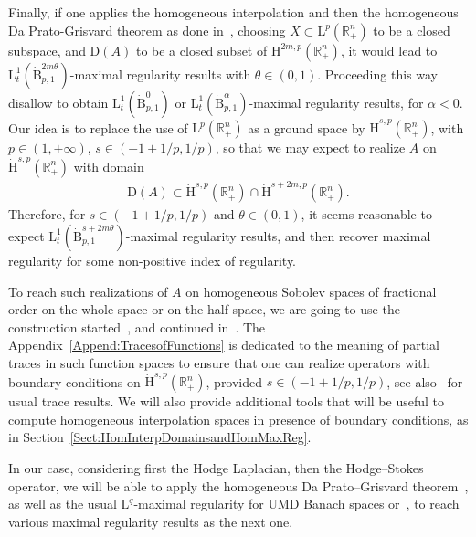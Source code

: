 \documentclass[10pt]{amsart}
\theoremstyle{definition}\newtheorem{defi}[theo]{Definition}\newtheorem{rema}[theo]{Remark}\newtheorem{exam}[theo]{Example}\newtheorem{exem}[theo]{Example}\newtheorem{nota}[theo]{Notation}
\newcommand{\bbR}{\mathbb{R}}
\newcommand{\rmH}{\mathrm{H}}%
\newcommand{\rmB}{\mathrm{B}}
\newcommand{\rmD}{\mathrm{D}}
\newcommand{\rmL}{\mathrm{L}}
\begin{document}
Finally, if one applies the homogeneous interpolation and then the homogeneous Da Prato-Grisvard theorem as done in~\cite[Chapters~2,~3~\&~4]{DanchinHieberMuchaTolk2020}, choosing $X\subset \rmL^p(\bbR^n_+)$ to be a closed subspace, and $\rmD(A)$ to be a closed subset of $\rmH^{2m,p}(\bbR^n_+)$, it would lead to $\rmL^1_t(\dot{\rmB}^{2m\theta}_{p,1})$-maximal regularity results with $\theta \in(0,1)$. Proceeding this way disallow to obtain $\rmL^1_t(\dot{\rmB}^{0}_{p,1})$ or $\rmL^1_t(\dot{\rmB}^{\alpha}_{p,1})$-maximal regularity results, for $\alpha<0$. Our idea is to replace the use of $\rmL^p(\bbR^n_+)$ as a ground space by $\dot{\rmH}^{s,p}(\bbR^n_+)$, with $p\in(1,+\infty)$, $s\in(-1+1/p,1/p)$, so that we may expect to realize $A$ on $\dot{\rmH}^{s,p}(\bbR^n_+)$ with domain
\begin{align*}
\rmD(A) \subset \dot{\rmH}^{s,p}\left(\bbR^n_+\right)\cap \dot{\rmH}^{s+2m,p}\left(\bbR^n_+\right).
\end{align*}
Therefore, for $s\in(-1+1/p,1/p)$ and $\theta\in(0,1)$, it seems reasonable to expect $\rmL^1_t(\dot{\rmB}^{s+2m\theta}_{p,1})$-maximal regularity results, and then recover maximal regularity for some non-positive index of regularity.

To reach such realizations of $A$ on homogeneous Sobolev spaces of fractional order on the whole space or on the half-space, we are going to use the construction started~\cite[Chapter~3]{DanchinHieberMuchaTolk2020}, and continued in~\cite[Sections~2~\&~3]{Gaudin2022}. The Appendix~\ref{Append:TracesofFunctions} is dedicated to the meaning of partial traces in such function spaces to ensure that one can realize operators with boundary conditions on $\dot{\rmH}^{s,p}(\bbR^n_+)$, provided $s\in(-1+1/p,1/p)$, see also~\cite[Section~4]{Gaudin2022} for usual trace results. We will also provide additional tools that will be useful to compute homogeneous interpolation spaces in presence of boundary conditions, as in Section~\ref{Sect:HomInterpDomainsandHomMaxReg}.


In our case, considering first the Hodge Laplacian, then the Hodge--Stokes operator, we will be able to apply the homogeneous Da Prato--Grisvard theorem~\cite[Theorem~2.20]{DanchinHieberMuchaTolk2020}, as well as the usual $\rmL^q$-maximal regularity for UMD Banach spaces or~\cite[Theorem~4.7]{Gaudin2023}, to reach various maximal regularity results as the next one.
\end{document}
